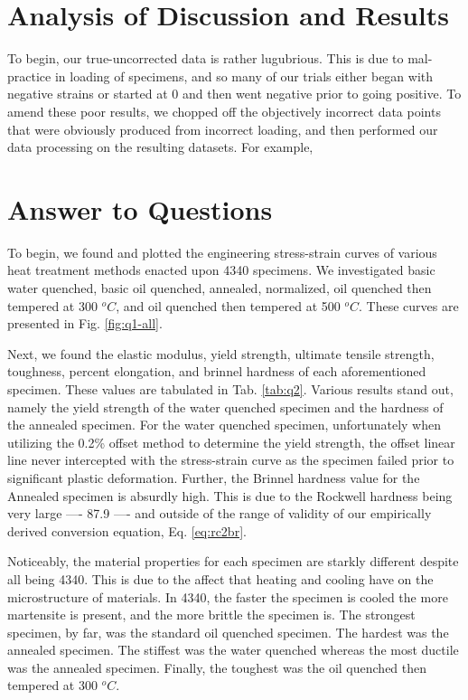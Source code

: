 \documentclass{article}
\begin{document}
\section{Analysis of Discussion and Results}
To begin, our true-uncorrected data is rather lugubrious. This is due to mal-practice in loading of specimens, and so many of our trials either began with negative strains or started at 0 and then went negative prior to going positive. To amend these poor results, we chopped off the objectively incorrect data points that were obviously produced from incorrect loading, and then performed our data processing on the resulting datasets. For example, 


\section{Answer to Questions}
To begin, we found and plotted the engineering stress-strain curves of various heat treatment methods enacted upon 4340 specimens. We investigated basic water quenched, basic oil quenched, annealed, normalized, oil quenched then tempered at 300 $^oC$, and oil quenched then tempered at 500 $^oC$. These curves are presented in Fig. \ref{fig:q1-all}.

Next, we found the elastic modulus, yield strength, ultimate tensile strength, toughness, percent elongation, and brinnel hardness of each aforementioned specimen. These values are tabulated in Tab. \ref{tab:q2}. Various results stand out, namely the yield strength of the water quenched specimen and the hardness of the annealed specimen. For the water quenched specimen, unfortunately when utilizing the 0.2\% offset method to determine the yield strength, the offset linear line never intercepted with the stress-strain curve as the specimen failed prior to significant plastic deformation. Further, the Brinnel hardness value for the Annealed specimen is absurdly high. This is due to the Rockwell hardness being very large ---- 87.9 ---- and outside of the range of validity of our empirically derived conversion equation, Eq. \ref{eq:rc2br}.

Noticeably, the material properties for each specimen are starkly different despite all being 4340. This is due to the affect that heating and cooling have on the microstructure of materials. In 4340, the faster the specimen is cooled the more martensite is present, and the more brittle the specimen is. The strongest specimen, by far, was the standard oil quenched specimen. The hardest was the annealed specimen. The stiffest was the water quenched whereas the most ductile was the annealed specimen. Finally, the toughest was the oil quenched then tempered at 300 $^oC$.
\end{document}
